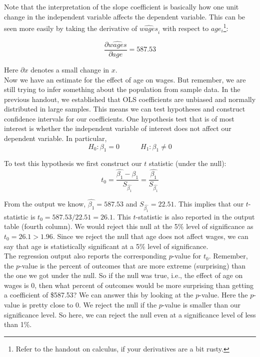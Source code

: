 \documentclass{./../handout}
\begin{document}
Note that the interpretation of the slope coefficient is basically how one unit change in the independent variable affects the dependent variable. This can be seen more easily by taking the derivative of $\hat{wages}_i$ with respect to $age_i$\footnote{Refer to the handout on calculus, if your derivatives are a bit rusty.}:

  $$ \frac{\partial \hat{wages}}{\partial age} =  587.53 $$
  
Here $\partial x$ denotes a small change in $x$. \\

Now we have an estimate for the effect of age on wages. But remember, we are still trying to infer something about the population from sample data. In the previous handout, we established that OLS coefficients are unbiased and normally distributed in large samples. This means we can test hypotheses and construct confidence intervals for our coefficients. One hypothesis test that is of most interest is whether the independent variable of interest does not affect our dependent variable. In particular, 
$$ H_0: \beta_1 = 0 \quad \quad \quad H_1: \beta_1 \neq 0  $$

To test this hypothesis we first construct our $t$ statistic (under the null):
$$ t_0 = \frac{\hat{\beta_1}-\beta_1}{S_{\hat{\beta_1}}} = \frac{\hat{\beta_1}}{S_{\hat{\beta_1}}}  $$ 

From the output we know, $\hat{\beta_1} = 587.53 $ and $S_{\hat{\beta_1}}= 22.51$. This implies that our $t$-statistic is $t_0 = 587.53/22.51 = 26.1 $. This $t$-statistic is also reported in the output table (fourth column). We would reject this null at the 5\% level of significance as $t_0=26.1>1.96$. Since we reject the null that age does not affect wages, we can say that age is statistically significant at a 5\% level of significance. \\

The regression output also reports the corresponding $p$-value for $t_0$. Remember, the $p$-value is the percent of outcomes that are more extreme (surprising) than the one we got under the null. So if the null was true, i.e., the effect of age on wages is 0, then what percent of outcomes would be more surprising than getting a coefficient of \$587.53? We can answer this by looking at the $p$-value. Here the $p$-value is pretty close to $0$. We reject the null if the $p$-value is smaller than our significance level. So here, we can reject the null even at a significance level of less than 1\%. \\
\end{document}
